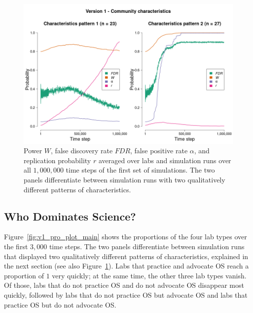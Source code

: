 \documentclass[meta, authordate,issue]{jote-new-article}
\begin{document}
\begin{figure}[!t]
  \begin{fullwidth}
    \centering
    \includegraphics[width=\textwidth]{v1_cha_plot_main.png}
    \caption{Power $W$, false discovery rate $FDR$, false positive rate $\alpha$, and replication probability $r$ averaged over labs and simulation runs over all $1,000,000$ time steps of the first set of simulations. The two panels differentiate between simulation runs with two qualitatively different patterns of characteristics.}
    \label{fig:v1_cha_plot_main}
  \end{fullwidth}
\end{figure}

\subsection{Who Dominates Science?}

Figure~\ref{fig:v1_pro_plot_main} shows the proportions of the four lab types over the first $3,000$ time steps. The two panels differentiate between simulation runs that displayed two qualitatively different patterns of characteristics, explained in the next section (see also Figure~\ref{fig:v1_cha_plot_main}). Labs that practice and advocate OS reach a proportion of $1$ very quickly; at the same time, the other three lab types vanish. Of those, labs that do not practice OS and do not advocate OS disappear most quickly, followed by labs that do not practice OS but advocate OS and labs that practice OS but do not advocate OS.
%
\end{document}
